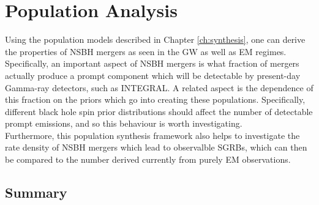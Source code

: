 \chapter{Population Analysis}\label{ch:analysis}

    Using the population models described in Chapter \ref{ch:synthesis}, one can derive
    the properties of NSBH mergers as seen in the GW as well as EM regimes.
    Specifically, an important aspect of NSBH mergers is what fraction of mergers
    actually produce a prompt component which will be detectable by present-day
    Gamma-ray detectors, such as INTEGRAL. A related aspect is the dependence of this
    fraction on the priors which go into creating these populations. Specifically,
    different black hole spin prior distributions should affect the number of detectable
    prompt emissions, and so this behaviour is worth investigating.\\
    Furthermore, this population synthesis framework also helps to investigate the
    rate density of NSBH mergers which lead to observalble SGRBs, which can then be
    compared to the number derived currently from purely EM observations.

\section{Summary}
